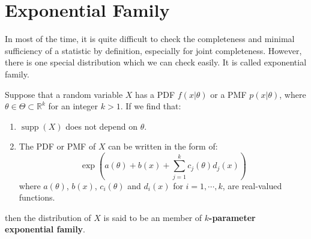 \documentclass{huhtakm-template-book-v2}
\DeclareMathOperator{\supp}{supp}
\begin{document}
\section{Exponential Family}
In most of the time, it is quite difficult to check the completeness and minimal sufficiency of a statistic by definition, especially for joint completeness. However, there is one special distribution which we can check easily. It is called exponential family.
\begin{defn}
	Suppose that a random variable $X$ has a PDF $f(x|\theta)$ or a PMF $p(x|\theta)$, where $\theta\in\Theta\subset\mathbb{R}^{k}$ for an integer $k>1$. If we find that:
	\begin{enumerate}
		\item $\supp(X)$ does not depend on $\theta$.
		\item The PDF or PMF of $X$ can be written in the form of:
		\begin{equation*}
			\exp\left(a(\theta)+b(x)+\sum_{j=1}^{k}c_{j}(\theta)d_{j}(x)\right)
		\end{equation*}
		where $a(\theta)$, $b(x)$, $c_{i}(\theta)$ and $d_{i}(x)$ for $i=1,\cdots,k$, are real-valued functions.
	\end{enumerate}
	then the distribution of $X$ is said to be an member of \textbf{$k$-parameter exponential family}.
\end{defn}
\end{document}
